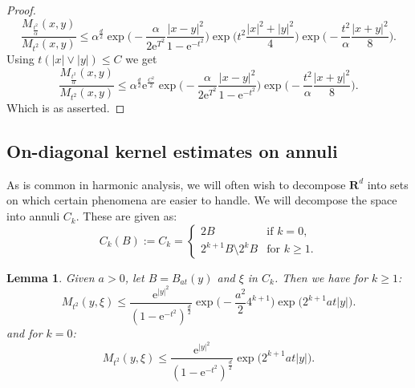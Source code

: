 \documentclass[a4paper,oneside,10pt]{amsproc}
\theoremstyle{plain}
\newtheorem{lemma}{Lemma}
\theoremstyle{remark}
\theoremstyle{definition}
\renewcommand{\leq}{\leqslant}
\renewcommand{\leq}{\leqslant}
\renewcommand{\geq}{\geqslant}
\newcommand{\R}{\mathbf R}
\newcommand{\e}{\mathrm{e}} %
\renewcommand{\leq}{\leqslant} %
\renewcommand{\geq}{\geqslant} %
\begin{document}
\begin{proof}
\begin{equation*}
    \frac{M_{\frac{t^2}{\alpha}}(x, y)}{M_{t^2}(x, y)} \leq \alpha^{\frac{d}2} \exp\biggl(-\frac{\alpha}{2\e^{T^2}} \frac{|x - y|^2}{1 - \e^{-t^2}} \biggr) \exp \biggl (t^2 \frac{|x|^2 + |y|^2}4 \biggr)
    \exp\biggl(-\frac{t^2}\alpha \frac{|x + y|^2}8 \biggr).
  \end{equation*}
  Using $t (|x| \vee |y|) \leq C$ we get
  \begin{equation*}
    \frac{M_{\frac{t^2}{\alpha}}(x, y)}{M_{t^2}(x, y)} \leq \alpha^{\frac{d}2}
    \e^{\frac{C^2}2} \exp\biggl(-\frac{\alpha}{2\e^{T^2}} \frac{|x - y|^2}{1 - \e^{-t^2}} \biggr)
    \exp\biggl(-\frac{t^2}\alpha \frac{|x + y|^2}8 \biggr).
  \end{equation*}
  Which is as asserted.
\end{proof}

\subsection{On-diagonal kernel estimates on annuli}
As is common in harmonic analysis, we will often wish to decompose
$\R^d$ into sets on which certain phenomena are easier to handle. We
will decompose the space into annuli $C_k$. These are given as:
\begin{equation}
  \label{eq:C_k-annulus-decomposition}
  C_k(B) := C_k =
  \begin{cases}
    2B &\text{if $k = 0$,}\\
    2^{k + 1}B \setminus 2^k B &\text{for $k \geq 1$.}
  \end{cases}
\end{equation}
\begin{lemma}\label{lem:On-diagonal-kernel-estimates-on-Ck}
  Given $a > 0$, let $B = B_{at}(y)$ and $\xi$ in $C_k$. Then we have
  for $k \geq 1$:
  \begin{equation*}
    M_{t^2}(y, \xi) \leq \frac{\e^{|y|^2}}{(1 - \e^{-t^2})^{\frac{d}2}}
    \exp\biggl(-\frac{a^2}{2} 4^{k + 1} \biggr) \exp\bigl(2^{k + 1} a t |y|
    \bigr).
  \end{equation*}
  and for $k = 0$:
  \begin{equation*}
    M_{t^2}(y, \xi) \leq \frac{\e^{|y|^2}}{(1 -
      \e^{-t^2})^{\frac{d}2}} \exp\bigl(2^{k + 1} a t |y| \bigr).
  \end{equation*}
\end{lemma}
\end{document}
